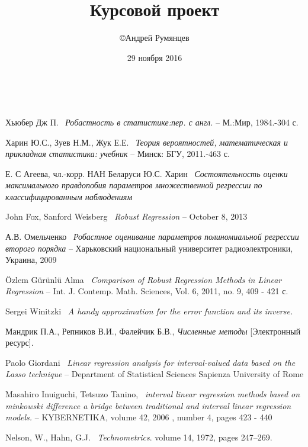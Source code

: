 \documentclass[a4paper,14pt]{extarticle}
\title{Курсовой проект}
\author{\copyright Андрей Румянцев}
\date{29 ноября 2016}
\begin{document}


\newpage 
~~~~~~~~~
\thispagestyle{empty}
\addtocounter{page}{-1}
\mbox{}
\newpage


\tableofcontents
\newpage 

% 


 
\newpage


\newpage


\newpage

\newpage
{}
\begin{thebibliography}{8}
    Хьюбер Дж П.~
    \textit{Робастность в статистике:пер. с англ.} --
    М.:Мир, 1984.-304 с.

    Харин Ю.С., Зуев Н.М.,
    Жук Е.Е.~
    \textit{Теория вероятностей, математическая и прикладная статистика: учебник} --
    Минск: БГУ, 2011.-463 с.

    

    Е. С Агеева, чл.-корр. НАН Беларуси Ю.С. Харин~
    \textit{Состоятельность оценки максимального правдопобия параметров множественной регрессии по классифицированным наблюдениям}

    John Fox, Sanford Weisberg~
    \textit{Robust Regression} --
    October 8, 2013

    А.В. Омельченко~
    \textit{Робастное оценивание параметров полиномиальной регрессии второго порядка} --
    Харьковский национальный университет радиоэлектроники, Украина, 2009

    \"{O}zlem G\"{u}r\"{u}nl\"{u} Alma~
    \textit{Comparison of Robust Regression Methods
    in Linear Regression} -- 
    Int. J. Contemp. Math. Sciences, Vol. 6, 2011, no. 9, 409 - 421 с.

    Sergei Winitzki~
    \textit{A handy approximation for the error function and its inverse.}

    Мандрик П.А., Репников В.И., Фалейчик Б.В.,
    \textit{Численные методы} [Электронный ресурс].

    Paolo Giordani~
    \textit{Linear regression analysis for interval-valued data based on the Lasso technique} --
    Department of Statistical Sciences Sapienza University of Rome

    Masahiro Inuiguchi, Tetsuzo Tanino,~
    \textit{interval linear regression methods based on minkowski difference a bridge between traditional and interval linear regression models.} --
    KYBERNETIKA, volume 42, 2006 , number 4, pages 423 - 440

     Nelson, W., Hahn, G.J.~
    \textit{Technometrics}. 
    volume 14, 1972, pages 247–269.
\end{thebibliography}
\newpage


\end{document}
